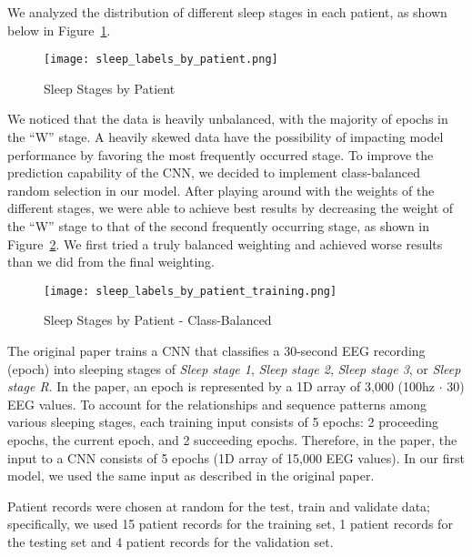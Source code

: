\documentclass{amia}
\begin{document}
We analyzed the distribution of different sleep stages in each patient, as shown below in Figure~\ref{fig:figure2}.

\begin{figure}[htb]
\begin{center}
\texttt{[image: sleep\_labels\_by\_patient.png]}
\end{center}
\caption{Sleep Stages by Patient}
\label{fig:figure2}
\end{figure}

We noticed that the data is heavily unbalanced, with the majority of epochs in the “W” stage. A heavily skewed data have the possibility of impacting model performance by favoring the most frequently occurred stage. To improve the prediction capability of the CNN, we decided to implement class-balanced random selection in our model. After playing around with the weights of the different stages, we were able to achieve best results by decreasing the weight of the  “W” stage to that of the second frequently occurring stage, as shown in Figure~\ref{fig:figure5}. We first tried a truly balanced weighting and achieved worse results than we did from the final weighting. 

\begin{figure}[htb]
\begin{center}
\texttt{[image: sleep\_labels\_by\_patient\_training.png]}
\end{center}
\caption{Sleep Stages by Patient - Class-Balanced}
\label{fig:figure5}
\end{figure}

The original paper trains a CNN that classifies a 30-second EEG recording (epoch) into sleeping stages of \textit{Sleep stage 1}, \textit{Sleep stage 2}, \textit{Sleep stage 3}, or \textit{Sleep stage R}. In the paper, an epoch is represented by a 1D array of 3,000 (100hz $\cdot$ 30) EEG values. To account for the relationships and sequence patterns among various sleeping stages, each training input consists of 5 epochs: 2 proceeding epochs, the current epoch, and 2 succeeding epochs. Therefore, in the paper, the input to a CNN consists of 5 epochs (1D array of 15,000 EEG values). In our first model, we used the same input as described in the original paper.

Patient records were chosen at random for the test, train and validate data; specifically, we used 15 patient records for the training set, 1 patient records for the testing set and 4 patient records for the validation set. 
\end{document}
